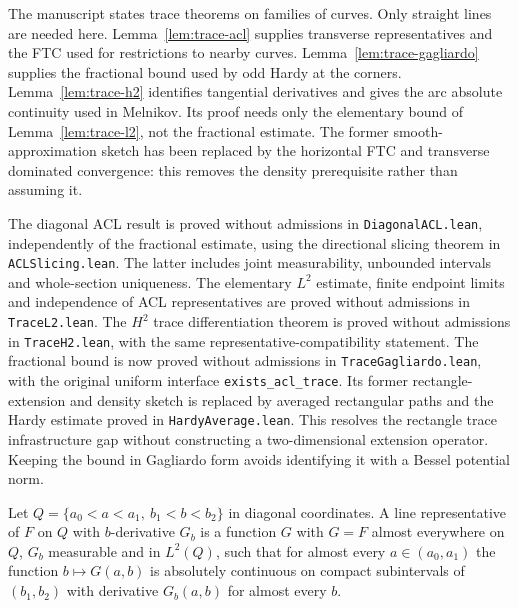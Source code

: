 \begin{remark}
The manuscript states trace theorems on families of curves. Only straight
lines are needed here. Lemma~\ref{lem:trace-acl} supplies transverse
representatives and the FTC used for restrictions to nearby curves.
Lemma~\ref{lem:trace-gagliardo} supplies the fractional bound used by odd
Hardy at the corners. Lemma~\ref{lem:trace-h2} identifies tangential
derivatives and gives the arc absolute continuity used in Melnikov.
Its proof needs only the elementary bound of Lemma~\ref{lem:trace-l2},
not the fractional estimate. The former smooth-approximation sketch has
been replaced by the horizontal FTC and transverse dominated convergence:
this removes the density prerequisite rather than assuming it.

The diagonal ACL result is proved without admissions in
\texttt{DiagonalACL.lean}, independently of the fractional estimate, using
the directional slicing theorem in \texttt{ACLSlicing.lean}. The latter
includes joint measurability, unbounded intervals and whole-section uniqueness.
The elementary $L^2$ estimate, finite endpoint limits and independence of
ACL representatives are proved without admissions in \texttt{TraceL2.lean}.
The $H^2$ trace differentiation theorem is proved without admissions in
\texttt{TraceH2.lean}, with the same representative-compatibility statement.
The fractional bound is now proved without admissions in
\texttt{TraceGagliardo.lean}, with the original uniform interface
\texttt{exists\_acl\_trace}. Its former rectangle-extension and density sketch
is replaced by averaged rectangular paths and the Hardy estimate proved in
\texttt{HardyAverage.lean}. This resolves the rectangle trace infrastructure
gap without constructing a two-dimensional extension operator. Keeping the
bound in Gagliardo form avoids identifying it with a Bessel potential norm.
\end{remark}

\begin{definition}
\label{def:line-representative}
\leanok
Let $Q=\{a_0<a<a_1,\ b_1<b<b_2\}$ in diagonal coordinates. A line representative of $F$ on $Q$
with $b$-derivative $G_b$ is a function $G$ with $G=F$ almost everywhere on $Q$, $G_b$
measurable and in $L^2(Q)$, such that for almost every $a\in(a_0,a_1)$ the function
$b\mapsto G(a,b)$ is absolutely continuous on compact subintervals of $(b_1,b_2)$ with
derivative $G_b(a,b)$ for almost every $b$.
\end{definition}

